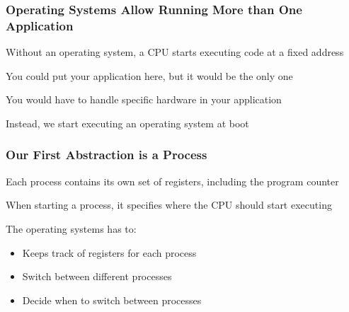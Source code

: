   \begin{frame}
    \frametitle{Operating Systems Allow Running More than One Application}

    Without an operating system, a CPU starts executing code at a fixed address

    \vspace{4em}

    You could put your application here, but it would be the only one

    \vspace{2em}

    You would have to handle specific hardware in your application

    \vspace{4em}

    Instead, we start executing an operating system at boot
  \end{frame}

  \begin{frame}
    \frametitle{Our First Abstraction is a Process}

    Each process contains its own set of registers, including the program counter

    \vspace{2em}
    
    When starting a process, it specifies where the CPU should start executing

    \vspace{4em}

    The operating systems has to:
    \begin{itemize}
      \item Keeps track of registers for each process
      \item Switch between different processes
      \item Decide when to switch between processes
    \end{itemize}
  \end{frame}

